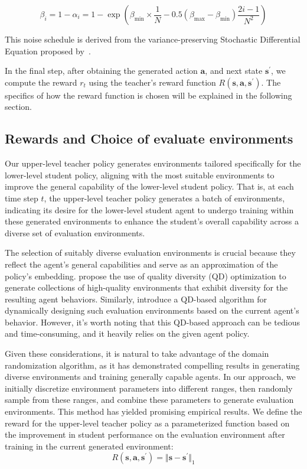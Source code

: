 \documentclass{article}
\newcommand\va{\bm{a}}
\newcommand\vs{\bm{s}}
\begin{document}
\begin{equation*}
    \beta_i = 1-\alpha_i = 1-\exp\left(\beta_{\min}\times \frac{1}{N} - 0.5(\beta_{\max}-\beta_{\min})\frac{2i -1}{N^2}\right)
\end{equation*}

This noise schedule is derived from the variance-preserving Stochastic Differential Equation proposed by~\citet{song2020score}.


In the final step, after obtaining the generated action $\va$, and next state $\vs^\prime$, we compute the reward $r_t$ using the teacher's reward function $R(\vs, \va,\vs^{\prime})$. The specifics of how the reward function is chosen will be explained in the following section.







\subsection{Rewards and Choice of evaluate environments}


Our upper-level teacher policy generates environments tailored specifically for the lower-level student policy, aligning with the most suitable environments to improve the general capability of the lower-level student policy. That is, at each time step $t$, the upper-level teacher policy generates a batch of environments, indicating its desire for the lower-level student agent to undergo training within these generated environments to enhance the student's overall capability across a diverse set of evaluation environments.


The selection of suitably diverse evaluation environments is crucial because they reflect the agent's general capabilities and serve as an approximation of the policy's embedding.  \citet{fontaine2021differentiable} propose the use of quality diversity (QD) optimization to generate collections of high-quality environments that exhibit diversity for the resulting agent behaviors. Similarly, \citet{bhatt2022deep} introduce a QD-based algorithm for dynamically designing such evaluation environments based on the current agent's behavior. However, it's worth noting that this QD-based approach can be tedious and time-consuming, and it heavily relies on the given agent policy.

Given these considerations, it is natural to take advantage of the domain randomization algorithm, as it has demonstrated compelling results in generating diverse environments and training generally capable agents. In our approach, we initially discretize environment parameters into different ranges, then randomly sample from these ranges, and combine these parameters to generate evaluation environments. This method has yielded promising empirical results. We define the reward for the upper-level teacher policy as a parameterized function based on the improvement in student performance on the evaluation environment after training in the current generated environment:
\begin{equation*}
    R(\vs, \va,\vs^{\prime}) = \Vert \vs-\vs^\prime \Vert_1
\end{equation*}
\end{document}

